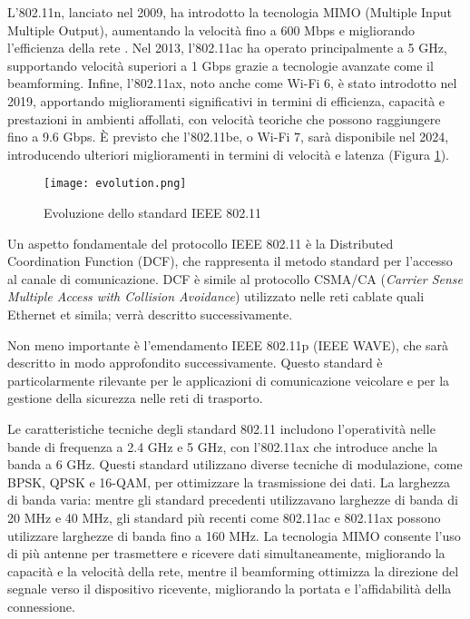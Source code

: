 L'802.11n, lanciato nel 2009, ha introdotto la tecnologia MIMO (Multiple Input Multiple Output), aumentando la velocità fino a 600 Mbps e migliorando l'efficienza della rete \cite{evolution}. Nel 2013, l'802.11ac ha operato principalmente a 5 GHz, supportando velocità superiori a 1 Gbps grazie a tecnologie avanzate come il beamforming. Infine, l'802.11ax, noto anche come Wi-Fi 6, è stato introdotto nel 2019, apportando miglioramenti significativi in termini di efficienza, capacità e prestazioni in ambienti affollati, con velocità teoriche che possono raggiungere fino a 9.6 Gbps. È previsto che l'802.11be, o Wi-Fi 7, sarà disponibile nel 2024, introducendo ulteriori miglioramenti in termini di velocità e latenza (Figura \ref{fig:evo}).

\begin{figure}[h!]
    \centering
    \texttt{[image: evolution.png]}
    \caption{Evoluzione dello standard IEEE 802.11}
    \label{fig:evo}
\end{figure}

Un aspetto fondamentale del protocollo IEEE 802.11 è la Distributed Coordination Function (DCF), che rappresenta il metodo standard per l'accesso al canale di comunicazione. DCF è simile al protocollo CSMA/CA (\textit{Carrier Sense Multiple Access with Collision Avoidance}) utilizzato nelle reti cablate quali Ethernet et simila; verrà descritto successivamente.

Non meno importante è l'emendamento IEEE 802.11p (IEEE WAVE), che sarà descritto in modo approfondito successivamente. Questo standard è particolarmente rilevante per le applicazioni di comunicazione veicolare e per la gestione della sicurezza nelle reti di trasporto.

Le caratteristiche tecniche degli standard 802.11 includono l'operatività nelle bande di frequenza a 2.4 GHz e 5 GHz, con l'802.11ax che introduce anche la banda a 6 GHz. Questi standard utilizzano diverse tecniche di modulazione, come BPSK, QPSK e 16-QAM, per ottimizzare la trasmissione dei dati. La larghezza di banda varia: mentre gli standard precedenti utilizzavano larghezze di banda di 20 MHz e 40 MHz, gli standard più recenti come 802.11ac e 802.11ax possono utilizzare larghezze di banda fino a 160 MHz. La tecnologia MIMO consente l'uso di più antenne per trasmettere e ricevere dati simultaneamente, migliorando la capacità e la velocità della rete, mentre il beamforming ottimizza la direzione del segnale verso il dispositivo ricevente, migliorando la portata e l'affidabilità della connessione.

